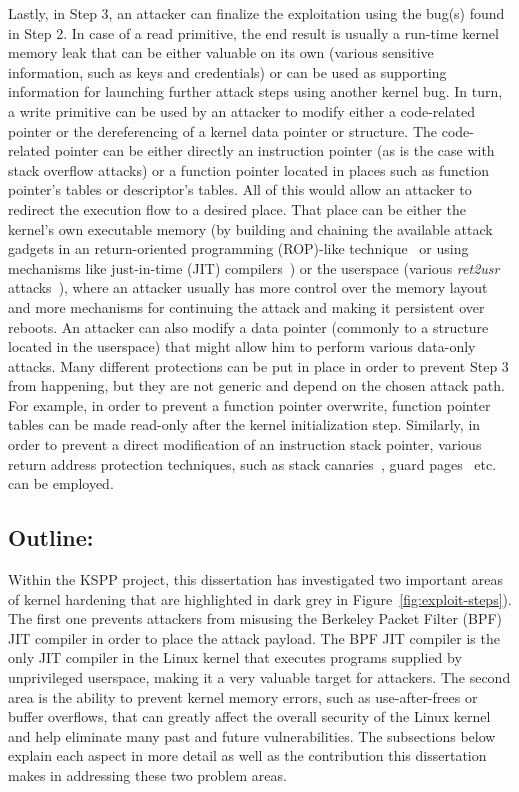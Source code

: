 Lastly, in Step 3, an attacker can finalize the exploitation using the bug(s) found in Step 2. In case of a read primitive, the end result is usually a run-time kernel memory leak that can be either valuable on its own (various sensitive information, such as keys and credentials) or can be used as supporting information for launching further attack steps using another kernel bug. In turn, a write primitive can be used by an attacker to modify either a code-related pointer or the dereferencing of a kernel data pointer or structure. The code-related pointer can be either directly an instruction pointer (as is the case with stack overflow attacks) or a function pointer located in places such as function pointer's tables or descriptor's tables. All of this would allow an attacker to redirect the execution flow to a desired place. That place can be either the kernel's own executable memory (by building and chaining the available attack gadgets in an return-oriented programming (ROP)-like technique~\cite{Shacham2007} or using mechanisms like just-in-time (JIT) compilers~\cite{Aycock03abrief}) or the userspace (various \textit{ret2usr} attacks~\cite{Kemerlis2012}), where an attacker usually has more control over the memory layout and more mechanisms for continuing the attack and making it persistent over reboots. An attacker can also modify a data pointer (commonly to a structure located in the userspace) that might allow him to perform various data-only attacks. Many different protections can be put in place in order to prevent Step 3 from happening, but they are not generic and depend on the chosen attack path. For example, in order to prevent a function pointer overwrite, function pointer tables can be made read-only after the kernel initialization step. Similarly, in order to prevent a direct modification of an instruction stack pointer, various return address protection techniques, such as stack canaries~\cite{edge2014}, guard pages~\cite{kstackoverflow2017} etc. can be employed.   

\subsection*{Outline:} 

Within the KSPP project, this dissertation has investigated two important areas of kernel hardening that are highlighted in dark grey in Figure~\ref{fig:exploit-steps}). The first one prevents attackers from misusing the Berkeley Packet Filter (BPF) JIT compiler in order to place the attack payload. The BPF JIT compiler is the only JIT compiler in the Linux kernel that executes programs supplied by unprivileged userspace, making it a very valuable target for attackers.  The second area is the ability to prevent kernel memory errors, such as use-after-frees or buffer overflows, that can greatly affect the overall security of the Linux kernel and help eliminate many past and future vulnerabilities. The subsections below explain each aspect in more detail as well as the contribution this dissertation makes in addressing these two problem areas.  

